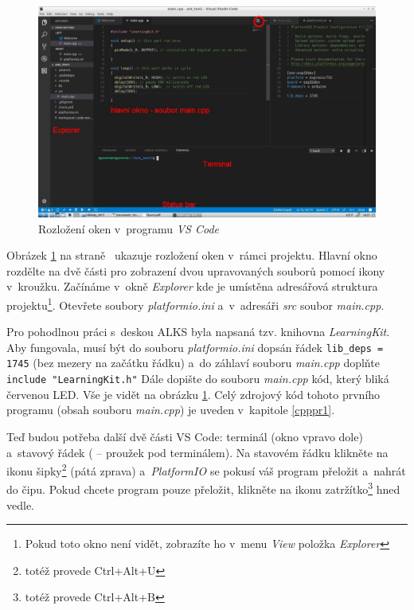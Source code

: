 
\begin{figure}[h]
	\includegraphics[width=\textwidth]{soubory/rozlozeni2.jpg}
	\caption{Rozložení oken v~programu {\it VS Code}} 
	\label{fig:vsc_rozlozeni}
\end{figure}	

Obrázek \ref{fig:vsc_rozlozeni} na straně~\pageref{fig:vsc_rozlozeni} ukazuje rozložení oken v~rámci projektu. Hlavní okno  rozdělte na dvě části pro zobrazení dvou upravovaných souborů pomocí ikony v~kroužku. Začínáme v~okně 
{\it Explorer} 
kde je umístěna adresářová struktura projektu\footnote{Pokud toto okno není vidět, zobrazíte ho v~menu {\it View} položka {\it Explorer} }. Otevřete soubory {\it platformio.ini} a~v~adresáři {\it src} soubor {\it main.cpp}. 
 
Pro pohodlnou práci s~deskou ALKS byla  napsaná tzv. knihovna {\it LearningKit}. Aby fungovala, musí být do souboru {\it platformio.ini} dopsán řádek 
{\tt lib\_deps = 1745} (bez mezery na začátku řádku)
a~do záhlaví souboru {\it main.cpp} doplňte
\verb| include "LearningKit.h"|
Dále dopište do souboru {\it main.cpp} kód, který bliká červenou LED. Vše je vidět na obrázku \ref{fig:vsc_rozlozeni}. Celý zdrojový kód tohoto prvního programu (obsah souboru {\it main.cpp}) je uveden v~kapitole \ref{cpppr1}.
 
Teď budou potřeba další dvě části VS Code: terminál  (okno vpravo dole) a~stavový řádek ( -- proužek pod terminálem). Na stavovém řádku klikněte na ikonu šipky\footnote{totéž provede Ctrl+Alt+U} (pátá zprava) a~{\it PlatformIO} se pokusí váš program přeložit a~nahrát do čipu. Pokud chcete program pouze přeložit, klikněte na ikonu zatržítko\footnote{totéž provede Ctrl+Alt+B} hned vedle. 

